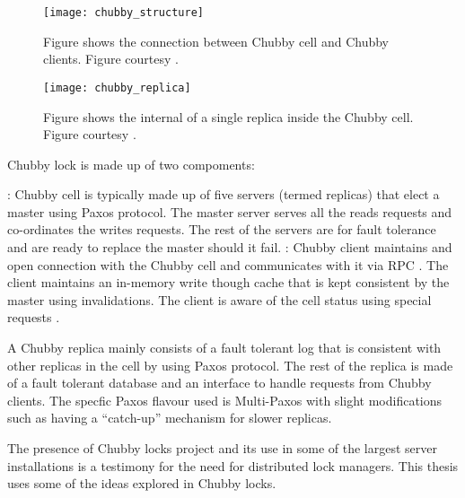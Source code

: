 \begin{figure}
  \texttt{[image: chubby\_structure]}
  \caption[Chubby structure]{%
    Figure shows the connection between Chubby cell and Chubby clients. 
    Figure courtesy \citet{Burrows06}.}
  \label{figure:chubby.structure}
\end{figure}

\begin{figure}
  \texttt{[image: chubby\_replica]}
  \caption[Chubby Replica]{%
    Figure shows the internal of a single replica inside the Chubby cell.
    Figure courtesy \citet{ChandraGR07}.}
  \label{figure:chubby.structure}
\end{figure}


Chubby lock is made up of two compoments:

\begin{itemize}
    : Chubby cell is typically made up of five servers 
    (termed replicas) that elect a master using Paxos protocol. The master
    server serves all the reads requests and co-ordinates the writes requests.
    The rest of the servers are for fault tolerance and are ready to replace the
    master should it fail.
    : Chubby client maintains and open connection with
    the Chubby cell and communicates with it via RPC%
    . The client maintains an in-memory write though cache that
    is kept consistent by the master using invalidations. The client is
    aware of the cell status using special requests%
    .
\end{itemize}

A Chubby replica mainly consists of a fault tolerant log that is consistent
with other replicas in the cell by using Paxos protocol. The rest of the
replica is made of a fault tolerant database and an interface to handle
requests from Chubby clients. The specfic Paxos flavour used is Multi-Paxos
with slight modifications such as having a ``catch-up'' mechanism for
slower replicas.

The presence of Chubby locks project and its use in some of the largest 
server installations is a testimony for the need for distributed lock
managers. This thesis uses some of the ideas explored in Chubby locks.

